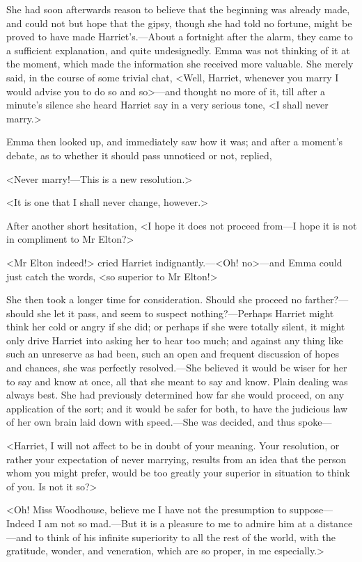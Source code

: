 She had soon afterwards reason to believe that the beginning was already made, and could not but hope that the gipsy, though she had told no fortune, might be proved to have made Harriet's.—About a fortnight after the alarm, they came to a sufficient explanation, and quite undesignedly. Emma was not thinking of it at the moment, which made the information she received more valuable. She merely said, in the course of some trivial chat, <Well, Harriet, whenever you marry I would advise you to do so and so>—and thought no more of it, till after a minute's silence she heard Harriet say in a very serious tone, <I shall never marry.>

Emma then looked up, and immediately saw how it was; and after a moment's debate, as to whether it should pass unnoticed or not, replied,

<Never marry!—This is a new resolution.>

<It is one that I shall never change, however.>

After another short hesitation, <I hope it does not proceed from—I hope it is not in compliment to Mr Elton?>

<Mr Elton indeed!> cried Harriet indignantly.—<Oh! no>—and Emma could just catch the words, <so superior to Mr Elton!>

She then took a longer time for consideration. Should she proceed no farther?—should she let it pass, and seem to suspect nothing?—Perhaps Harriet might think her cold or angry if she did; or perhaps if she were totally silent, it might only drive Harriet into asking her to hear too much; and against any thing like such an unreserve as had been, such an open and frequent discussion of hopes and chances, she was perfectly resolved.—She believed it would be wiser for her to say and know at once, all that she meant to say and know. Plain dealing was always best. She had previously determined how far she would proceed, on any application of the sort; and it would be safer for both, to have the judicious law of her own brain laid down with speed.—She was decided, and thus spoke—

<Harriet, I will not affect to be in doubt of your meaning. Your resolution, or rather your expectation of never marrying, results from an idea that the person whom you might prefer, would be too greatly your superior in situation to think of you. Is not it so?>

<Oh! Miss Woodhouse, believe me I have not the presumption to suppose— Indeed I am not so mad.—But it is a pleasure to me to admire him at a distance—and to think of his infinite superiority to all the rest of the world, with the gratitude, wonder, and veneration, which are so proper, in me especially.>


